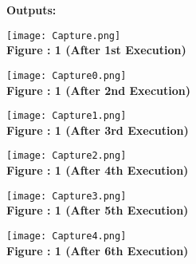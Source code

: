 \documentclass[11pt]{article}            %
\begin{document}
\textbf{Outputs: }\\ 

\begin{center}
 \texttt{[image: Capture.png]}\\ 
\textbf{Figure : 1 (After 1st Execution)}
\vskip 0.5cm
\end{center}

\begin{center}
 \texttt{[image: Capture0.png]}\\ 
\textbf{Figure : 1 (After 2nd Execution)}
\vskip 0.5cm
\end{center}

\begin{center}
 \texttt{[image: Capture1.png]}\\ 
\textbf{Figure : 1 (After 3rd Execution)}
\vskip 0.5cm
\end{center}

\begin{center}
 \texttt{[image: Capture2.png]}\\ 
\textbf{Figure : 1 (After 4th Execution)}
\vskip 0.5cm
\end{center}

\begin{center}
 \texttt{[image: Capture3.png]}\\ 
\textbf{Figure : 1 (After 5th Execution)}
\vskip 0.5cm
\end{center}

\begin{center}
 \texttt{[image: Capture4.png]}\\ 
\textbf{Figure : 1 (After 6th Execution)}
\vskip 0.5cm
\end{center}

 
\end{document}
